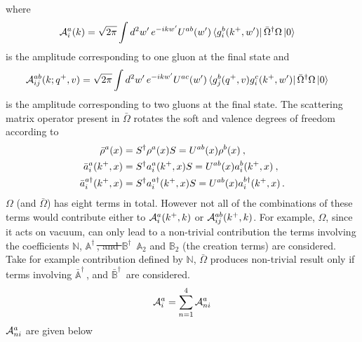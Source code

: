 \documentclass[aps,prd,amsmath,amssymb,nofootinbib]{revtex4-2}
\def\mf#1{\mathbb{#1}}
\numberwithin{equation}{section}
\begin{document}
where \begin{align}
    {\cal A}^{a}_{i}(k) & = \sqrt{2\pi} \int d^{2}w^\prime\,e^{-ikw^\prime} U^{ab}(w^\prime)\bra{g^{b}_{i}(k^{+},w^\prime)}\Bar{\Omega}^{\dagger}\Omega\ket{0}
\end{align}
is the amplitude corresponding to one gluon at the final state and 
\begin{align}
     {\cal A}^{ab}_{ij}(k; q^+, v) & = \sqrt{2\pi} \int d^{2} w^{\prime}\,  e^{-ikw^\prime} U^{ac}(w^\prime)\bra{g^{b}_{j}(q^{+},v)g^{c}_{i}(k^{+},w^\prime)}\Bar{\Omega}^{\dagger}\Omega\ket{0}
\end{align}
 is the amplitude corresponding to two gluons at the final state. 
The scattering matrix operator present in $\bar \Omega$ rotates the soft and valence degrees of freedom according to  
\begin{align}
    \bar \rho^a(x)  &= S^\dagger  \rho^a(x) S 
    = U^{a b}(x)  \rho^b(x) \:, \notag  \\ 
    \bar a_i^a(k^+, x)  &= S^\dagger a_i^{a}(k^+,x) S 
    = U^{a b}(x)  a_i^b(k^+,x) \:, \notag  \\
    \bar a_i^{a\dagger}(k^+,x)  &= S^\dagger a_i^{a\dagger}(k^+,x) S 
    = U^{a b}(x)  a_i^{b\dagger}(k^+, x) \,. 
\end{align}
$\Omega$ (and $\bar \Omega$) has eight terms in total. 
However not all of the combinations of these terms would contribute either to  $  {\cal A}_i^a (k^+, k) $ or ${\cal A}^{ab}_{ij}(k^{+},k)$.  For example, $\Omega$, since it acts on vacuum, can only lead to a non-trivial contribution the terms involving the coefficients $\mf{N}$, {\color{orange}\sout{$\mf{A}^\dagger\,$, and $\mf{B}^\dagger\,$}} {\color{red}$\mf{A}_2$ and $\mf{B}_2$ (the creation terms)} are considered.  
Take for example contribution defined by $\mf{N}$, $\bar \Omega$ produces non-trivial result only if terms involving $\bar {\mf{A}}^\dagger\,$, and $\bar {\mf{B}}^\dagger\,$ are considered. 
\begin{align}
    {\cal A}^{a}_i = \sum_{n=1}^4 {\cal A}^{a}_{n i} 
\end{align}
${\cal A}^{a}_{n i}$ are given below  
\end{document}
